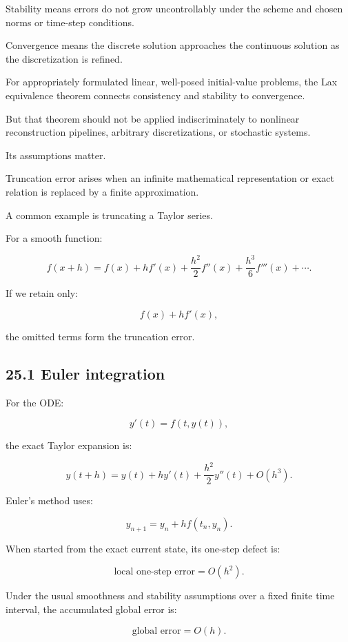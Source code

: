 Stability means errors do not grow uncontrollably under the scheme and chosen norms or time-step conditions.

Convergence means the discrete solution approaches the continuous solution as the discretization is refined.

For appropriately formulated linear, well-posed initial-value problems, the Lax equivalence theorem connects consistency and stability to convergence.

But that theorem should not be applied indiscriminately to nonlinear reconstruction pipelines, arbitrary discretizations, or stochastic systems.

Its assumptions matter.

Truncation error arises when an infinite mathematical representation or exact relation is replaced by a finite approximation.

A common example is truncating a Taylor series.

For a smooth function:

\[ f(x+h) = f(x)+hf'(x)+\frac{h^2}{2}f''(x) +\frac{h^3}{6}f'''(x)+\cdots. \]

If we retain only:

\[ f(x)+hf'(x), \]

the omitted terms form the truncation error.

\subsection{25.1 Euler integration}\label{02-foundations-ii-ch029-euler-integration}

\hypertarget{02-foundations-ii-ch029-euler-integration}{}

For the ODE:

\[ y'(t)=f(t,y(t)), \]

the exact Taylor expansion is:

\[ y(t+h) = y(t)+hy'(t)+\frac{h^2}{2}y''(t)+O(h^3). \]

Euler's method uses:

\[ y_{n+1}=y_n+hf(t_n,y_n). \]

When started from the exact current state, its one-step defect is:

\[ \boxed{ \text{local one-step error}=O(h^2) }. \]

Under the usual smoothness and stability assumptions over a fixed finite time interval, the accumulated global error is:

\[ \boxed{ \text{global error}=O(h) }. \]

